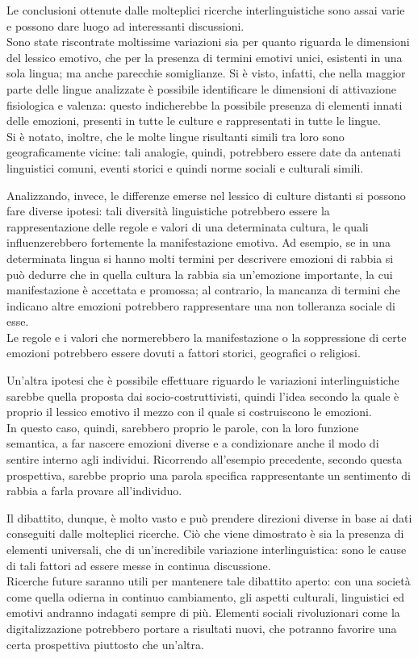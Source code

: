 Le conclusioni ottenute dalle molteplici ricerche interlinguistiche sono assai varie e possono dare luogo ad interessanti discussioni. \\
Sono state riscontrate moltissime variazioni sia per quanto riguarda le dimensioni del lessico emotivo, che per la presenza di termini emotivi unici, esistenti in una sola lingua; ma anche parecchie somiglianze. Si è visto, infatti, che nella maggior parte delle lingue analizzate è possibile identificare le dimensioni di attivazione fisiologica e valenza: questo indicherebbe la possibile presenza di elementi innati delle emozioni, presenti in tutte le culture e rappresentati in tutte le lingue. \\
Si è notato, inoltre, che le molte lingue risultanti simili tra loro sono geograficamente vicine: tali analogie, quindi, potrebbero essere date da antenati linguistici comuni, eventi storici e quindi norme sociali e culturali simili. 

Analizzando, invece, le differenze emerse nel lessico di culture distanti si possono fare diverse ipotesi: tali diversità linguistiche potrebbero essere la rappresentazione delle regole e valori di una determinata cultura, le quali influenzerebbero fortemente la manifestazione emotiva. Ad esempio, se in una determinata lingua si hanno molti termini per descrivere emozioni di rabbia si può dedurre che in quella cultura la rabbia sia un'emozione importante, la cui manifestazione è accettata e promossa; al contrario, la mancanza di termini che indicano altre emozioni potrebbero rappresentare una non tolleranza sociale di esse. \\
Le regole e i valori che normerebbero la manifestazione o la soppressione di certe emozioni potrebbero essere dovuti a fattori storici, geografici o religiosi.

Un'altra ipotesi che è possibile effettuare riguardo le variazioni interlinguistiche sarebbe quella proposta dai socio-costruttivisti, quindi l'idea secondo la quale è proprio il lessico emotivo il mezzo con il quale si costruiscono le emozioni. \\
In questo caso, quindi, sarebbero proprio le parole, con la loro funzione semantica, a far nascere emozioni diverse e a condizionare anche il modo di sentire interno agli individui. Ricorrendo all'esempio precedente, secondo questa prospettiva, sarebbe proprio una parola specifica rappresentante un sentimento di rabbia a farla provare all'individuo. 

Il dibattito, dunque, è molto vasto e può prendere direzioni diverse in base ai dati conseguiti dalle molteplici ricerche. Ciò che viene dimostrato è sia la presenza di elementi universali, che di un'incredibile variazione interlinguistica: sono le cause di tali fattori ad essere messe in continua discussione. \\
Ricerche future saranno utili per mantenere tale dibattito aperto: con una società come quella odierna in continuo cambiamento, gli aspetti culturali, linguistici ed emotivi andranno indagati sempre di più. Elementi sociali rivoluzionari come la digitalizzazione potrebbero portare a risultati nuovi, che potranno favorire una certa prospettiva piuttosto che un'altra. 
\clearpage